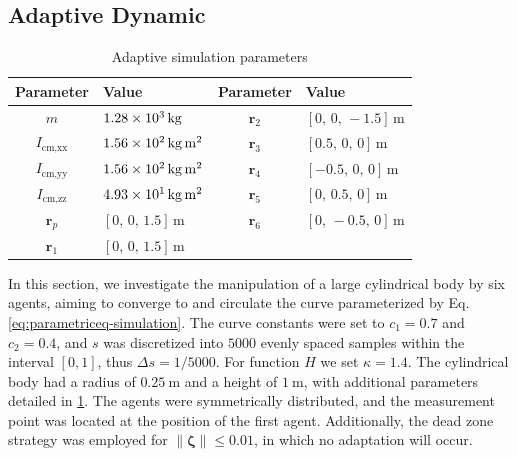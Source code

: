 \subsection{Adaptive Dynamic}
\begin{table}[htb]
\begin{center}
\caption{Adaptive simulation parameters}\label{tb:parameters}\vspace{-2mm}
\begin{tabular}{clcl}
Parameter & Value & Parameter & Value\\\hline
$m$ & $\qty{1.28E3}{\kilogram}$ & $\mathbf{r}_{2}$ & $[0,\,0,\,-1.5]\,\unit{\meter}$\\
$I_\text{cm,xx}$ & $\qty{1.56E2}{\kilogram\meter\squared}$ & $\mathbf{r}_{3}$ & $[0.5,\,0,\,0]\,\unit{\meter}$\\
$I_\text{cm,yy}$ & $\qty{1.56E2}{\kilogram\meter\squared}$ & $\mathbf{r}_{4}$ & $[-0.5,\,0,\,0]\,\unit{\meter}$\\
$I_\text{cm,zz}$ & $\qty{4.93E1}{\kilogram\meter\squared}$ & $\mathbf{r}_{5}$ & $[0,\,0.5,\,0]\,\unit{\meter}$\\
$\mathbf{r}_{p}$ & $[0,\,0,\,1.5]\,\unit{\meter}$ & $\mathbf{r}_{6}$ & $[0,\,-0.5,\,0]\,\unit{\meter}$\\
$\mathbf{r}_{1}$ & $[0,\,0,\,1.5]\,\unit{\meter}$\\\hline
\end{tabular}
\end{center}
\end{table}
In this section, we investigate the manipulation of a large cylindrical body by six agents, aiming to converge to and circulate the curve parameterized by Eq. \eqref{eq:parametriceq-simulation}. The curve constants were set to $c_1 = 0.7$ and $c_2 = 0.4$, and $s$ was discretized into $5000$ evenly spaced samples within the interval $[0, 1]$, thus $\Delta s=1\slash5000$. For function $H$ we set $\kappa=1.4$. The cylindrical body had a radius of $\qty{0.25}{\meter}$ and a height of $\qty{1}{\meter}$, with additional parameters detailed in \cref{tb:parameters}. The agents were symmetrically distributed, and the measurement point was located at the position of the first agent. Additionally, the dead zone strategy \citep{ioannou2012robust} was employed for $\|\boldsymbol{\zeta}\| \le 0.01$, in which no adaptation will occur.


